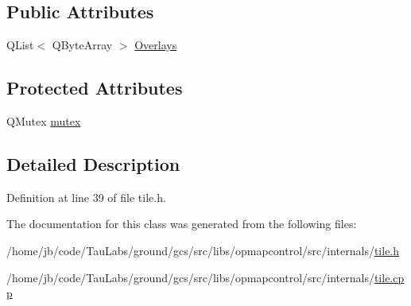 \subsection*{\-Public \-Attributes}
\begin{DoxyCompactItemize}
\item 
\-Q\-List$<$ \-Q\-Byte\-Array $>$ \hyperlink{group___o_p_map_widget_ga45369aa8480e3bd7ff5c6a6017573361}{\-Overlays}
\end{DoxyCompactItemize}
\subsection*{\-Protected \-Attributes}
\begin{DoxyCompactItemize}
\item 
\-Q\-Mutex \hyperlink{group___o_p_map_widget_gadfb1115a74bee691ed9d70c97b727ef7}{mutex}
\end{DoxyCompactItemize}


\subsection{\-Detailed \-Description}


\-Definition at line 39 of file tile.\-h.



\-The documentation for this class was generated from the following files\-:\begin{DoxyCompactItemize}
\item 
/home/jb/code/\-Tau\-Labs/ground/gcs/src/libs/opmapcontrol/src/internals/\hyperlink{tile_8h}{tile.\-h}\item 
/home/jb/code/\-Tau\-Labs/ground/gcs/src/libs/opmapcontrol/src/internals/\hyperlink{tile_8cpp}{tile.\-cpp}\end{DoxyCompactItemize}
